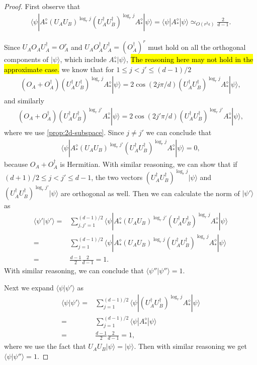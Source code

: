 \documentclass[11pt,letterpaper]{article}
\newcommand{\ket}[1]{|#1\rangle}
\newcommand{\bra}[1]{\langle#1|}
\newcommand{\braket}[2]{\langle#1|#2\rangle}
\newcommand{\ct}{^{\dagger}}
\newcommand{\1}{\mathbb{1}}
\newcommand{\ep}{\epsilon}
\newcommand{\appd}[1]{\simeq_{#1}}
\theoremstyle{definition}
\begin{document}
\begin{proof}
	First observe that 
	\begin{align}
		\bra{\psi}A_\ast^\diamond (U_AU_B)^{\log_r j} (U_A\ct U_B\ct)^{\log_r j} A_\ast^\diamond \ket{\psi} =
		\bra{\psi} A_\ast^\diamond \ket{\psi} \appd{O(r^2\ep)} \frac{2}{d-1}.
	\end{align}
	
	Since $U_AO_A U_A\ct = O_A^r$ and $U_AO_A\ct U_A\ct = (O_A\ct)^r$ 
	must hold on all the orthogonal components of $\ket{\psi}$, which include $A_\ast^\diamond \ket{\psi}$,
	\hl{The reasoning here may not hold in the approximate case.}
	we know that for $1 \leq j < j' \leq (d-1)/2$
	\begin{align}
        	(O_A +O_A\ct) (U_A\ct U_B\ct)^{\log_r j} A_\ast^\diamond \ket{\psi} 
        	= 2\cos(2j \pi/d) (U_A\ct U_B\ct )^{\log_r j} A_\ast^\diamond \ket{\psi},
	\end{align}
	and similarly
        \begin{align}
        		(O_A+O_A\ct) (U_A\ct U_B\ct)^{\log_r j'} A_\ast^\diamond \ket{\psi} = 2\cos(2j'\pi/d) (U_A\ct U_B\ct )^{\log_r j'} A_\ast^\diamond \ket{\psi},
        \end{align}
        where we use \cref{prop:2d-subspace}.
	Since $j \neq j'$ we can conclude that 
	\begin{align}
		\bra{\psi} A_\ast^\diamond(U_A U_B)^{\log_r j'} (U_A\ct U_B\ct)^{\log_r j} A_\ast^\diamond \ket{\psi} = 0,
	\end{align}
	because $O_A +O_A\ct$ is Hermitian.
	With similar reasoning, we can show that if $(d+1)/2 \leq j < j' \leq d-1$, the two vectors 
	$(U_A\ct U_B\ct)^{\log_r j} \ket{\psi}$ and $(U_A\ct U_B\ct)^{\log_r j'} \ket{\psi}$ are orthogonal as well.
	Then we can calculate the norm of $\ket{\psi'}$ as 
	\begin{align}
		 \braket{\psi'}{\psi'} =& \sum_{j,j'=1}^{(d-1)/2} \bra{\psi} A_\ast^\diamond(U_A U_B)^{\log_r j'} (U_A\ct U_B\ct)^{\log_r j} A_\ast^\diamond \ket{\psi}\\
		 = & \sum_{j=1}^{(d-1)/2} \bra{\psi} A_\ast^\diamond(U_A U_B)^{\log_r j} (U_A\ct U_B\ct)^{\log_r j} A_\ast^\diamond \ket{\psi}\\
		 = & \frac{d-1}{2} \frac{2}{d-1} = 1.
	\end{align}
	With similar reasoning, we can conclude that $\braket{\psi''}{\psi''} = 1$.
	
	Next we expand $\braket{\psi}{\psi'}$ as
	\begin{align}
		\braket{\psi}{\psi'} =& \sum_{j=1}^{(d-1)/2} \bra{\psi} (U_A\ct U_B\ct)^{\log_r j} A_\ast^\diamond \ket{\psi}  \\
		=&\sum_{j=1}^{(d-1)/2} \bra{\psi} A_\ast^\diamond \ket{\psi}\\
		=& \frac{d-1}{2} \frac{2}{d-1} = 1,
	\end{align}
	where we use the fact that $U_AU_B\ket{\psi} = \ket{\psi}$.
	Then with similar reasoning we get 
	$\braket{\psi}{\psi''} = 1$.
\end{proof}
\end{document}
